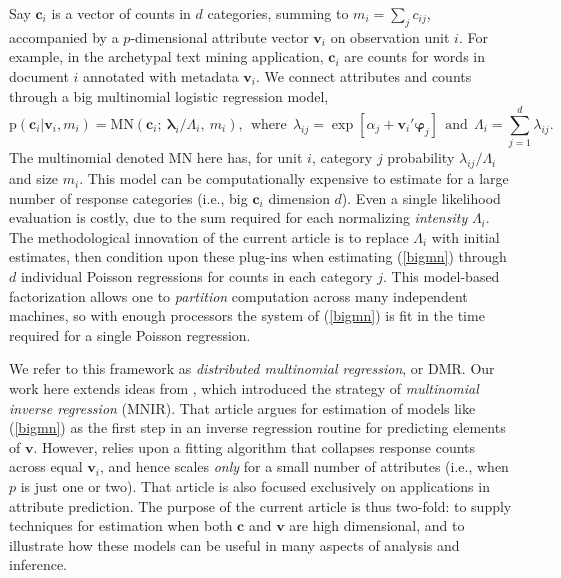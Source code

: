 \documentclass[12pt]{article}
\newcommand{\bs}[1]{\boldsymbol{#1}}
\newcommand{\mr}[1]{\mathrm{#1}}
\newcommand{\bm}[1]{\mathbf{#1}}
\begin{document}
Say $\bm{c}_i$ is a vector of counts in $d$ categories, summing to $m_i =
\sum_j c_{ij}$, accompanied by a $p$-dimensional attribute vector $\bm{v}_i$ on observation
unit $i$.  For example, in the archetypal text mining application, $\bm{c}_i$
are counts for words in document $i$ annotated with metadata $\bm{v}_i$.   We
connect attributes and counts through a big multinomial logistic regression
model,
\begin{equation}\label{bigmn}
\mr{p}(\bm{c}_{i} | \bm{v}_i,m_i) = 
\mr{MN}\left(\bm{c}_i;~\bs{\lambda}_{i}/\Lambda_i,
~m_i\right),~~\text{where}~~\lambda_{ij} = \exp[\alpha_j + \bm{v}_i'\bs{\varphi}_j]~~\text{and}~~\Lambda_i = \sum_{j=1}^d\lambda_{ij}.
 \end{equation} 
 The multinomial denoted $\mr{MN}$ here has, for unit $i$, category $j$ probability
$\lambda_{ij}/\Lambda_i$ and size $m_i$. This model can be computationally
expensive to estimate for a large number of response categories (i.e., big
$\bm{c}_i$ dimension $d$).  Even a single likelihood evaluation is costly, due
to the sum required for each normalizing {\it intensity} $\Lambda_i$. The
methodological innovation of the current article is to replace $\Lambda_i$
with initial estimates, then condition upon these plug-ins when estimating
(\ref{bigmn}) through $d$ individual Poisson regressions for counts in each
category $j$. This model-based factorization allows one to {\it partition}
computation across many independent machines, so with enough processors the
system of (\ref{bigmn}) is fit in the time required for a single Poisson
regression.

We refer to this framework as {\it distributed multinomial regression}, or DMR.
Our work here extends ideas from \cite{taddy_multinomial_2013}, which
introduced the strategy of {\it multinomial inverse regression} (MNIR).  That
article argues for estimation of models like (\ref{bigmn}) as the first step
in an inverse regression routine for predicting elements of $\bm{v}$.
However, \cite{taddy_multinomial_2013} relies upon a fitting algorithm that
collapses response counts across equal $\bm{v}_i$, and hence scales {\it only}
for a small number of attributes (i.e., when $p$ is just one or two). That
article is also focused exclusively on applications in attribute prediction.
The purpose of the current article is thus two-fold: to supply techniques for
estimation when both $\bm{c}$ and $\bm{v}$ are high dimensional, and to
illustrate how these models can be useful in many aspects of analysis and
inference.
\end{document}
